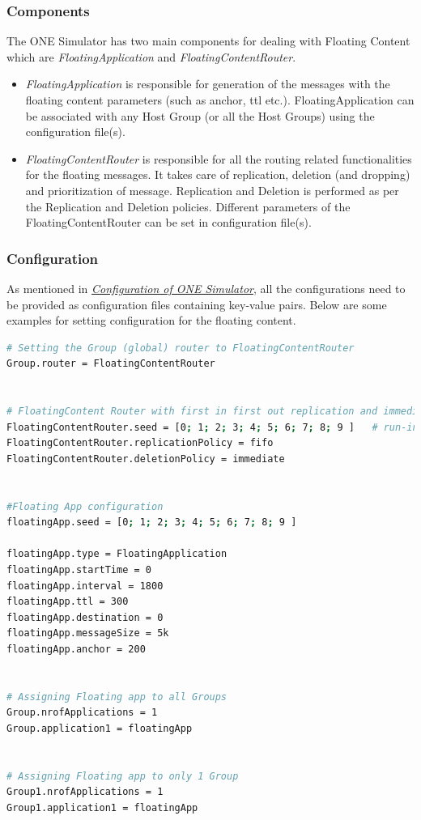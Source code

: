 \subsubsection{Components}
The ONE Simulator has two main components for dealing with Floating Content which are \textit{FloatingApplication} and \textit{FloatingContentRouter}.

\begin{itemize}
\item \textit{FloatingApplication} is responsible for generation of the messages with the floating content parameters (such as anchor, ttl etc.). FloatingApplication can be associated with any Host Group (or all the Host Groups) using the configuration file(s). 
\item \textit{FloatingContentRouter} is responsible for all the routing related functionalities for the floating messages. It takes care of replication, deletion (and dropping) and prioritization of message. Replication and Deletion is performed as per the Replication and Deletion policies. Different parameters of the FloatingContentRouter can be set in configuration file(s).
\end{itemize}


\subsubsection{Configuration}
As mentioned in \hyperref[one:configuration]{\emph{Configuration of ONE Simulator}}, all the configurations need to be provided as configuration files containing key-value pairs. Below are some examples for setting configuration for the floating content.

\begin{lstlisting}[language=bash]
# Setting the Group (global) router to FloatingContentRouter
Group.router = FloatingContentRouter


# FloatingContent Router with first in first out replication and immediate deletion
FloatingContentRouter.seed = [0; 1; 2; 3; 4; 5; 6; 7; 8; 9 ]   # run-indexed seed for random number generator
FloatingContentRouter.replicationPolicy = fifo
FloatingContentRouter.deletionPolicy = immediate


#Floating App configuration
floatingApp.seed = [0; 1; 2; 3; 4; 5; 6; 7; 8; 9 ]

floatingApp.type = FloatingApplication
floatingApp.startTime = 0
floatingApp.interval = 1800
floatingApp.ttl = 300
floatingApp.destination = 0
floatingApp.messageSize = 5k
floatingApp.anchor = 200


# Assigning Floating app to all Groups
Group.nrofApplications = 1
Group.application1 = floatingApp


# Assigning Floating app to only 1 Group
Group1.nrofApplications = 1
Group1.application1 = floatingApp

\end{lstlisting}